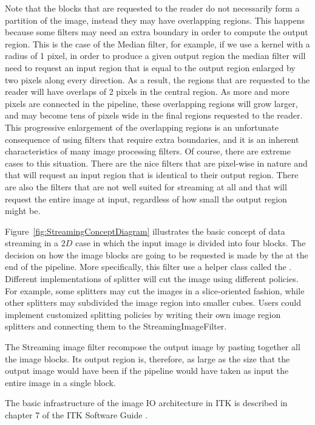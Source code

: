 \documentclass{InsightArticle}
\begin{document}
 Note that the blocks that are requested to the reader do not necessarily form
 a partition of the image, instead they may have overlapping regions. This
 happens because some filters may need an extra boundary in order to compute
 the output region. This is the case of the Median filter, for example, if we
 use a kernel with a radius of 1 pixel, in order to produce a given output region
 the median filter will need to request an input region that is equal to the
 output region enlarged by two pixels along every direction. As a result, the
 regions that are requested to the reader will have overlaps of 2 pixels in the
 central region.  As more and more pixels are connected in the pipeline, these
 overlapping regions will grow larger, and may become tens of pixels wide in
 the final regions requested to the reader. This progressive enlargement of the
 overlapping regions is an unfortunate consequence of using filters that
 require extra boundaries, and it is an inherent characteristics of many image
 processing filters. Of course, there are extreme cases to this situation.
 There are the nice filters that are pixel-wise in nature and that will request
 an input region that is identical to their output region. There are also the
 filters that are not well suited for streaming at all and that will request
 the entire image at input, regardless of how small the output region might be.

Figure~\ref{fig:StreamingConceptDiagram} illustrates the basic concept of data
streaming in a $2D$ case in which the input image is divided into four blocks.
The decision on how the image blocks are going to be requested is made by the
 at the end of the pipeline. More specifically,
this filter use a helper class called the .
Different implementations of splitter will cut the image using different
policies. For example, some splitters may cut the images in a slice-oriented
fashion, while other splitters may subdivided the image region into smaller
cubes. Users could implement customized splitting policies by writing their own
image region splitters and connecting them to the StreamingImageFilter.

The Streaming image filter recompose the output image by pasting together all
the image blocks. Its output region is, therefore, as large as the size that
the output image would have been if the pipeline would have taken as input the
entire image in a single block.

The basic infrastructure of the image IO architecture in ITK is described in
chapter 7 of the ITK Software Guide \cite{ITKSoftwareGuideSecondEdition}.
\end{document}
